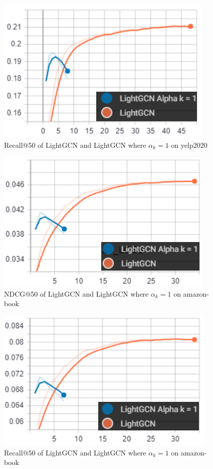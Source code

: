 \begin{figure}
    \includegraphics[width=\linewidth]{figures/alpha-k-results/yelp2020-recall.png}
    \caption{Recall@50 of LightGCN and LightGCN where $\alpha_k = 1$ on yelp2020}
    \label{fig:recall-yelp2020-alpha-k}
\end{figure}
\begin{figure}
    \includegraphics[width=\linewidth]{figures/alpha-k-results/amazon-ndcg.png}
    \caption{NDCG@50 of LightGCN and LightGCN where $\alpha_k = 1$ on amazon-book}
    \label{fig:ndcg-amazon-alpha-k}
\end{figure}
\begin{figure}
    \includegraphics[width=\linewidth]{figures/alpha-k-results/amazon-recall.png}
    \caption{Recall@50 of LightGCN and LightGCN where $\alpha_k = 1$ on amazon-book}
    \label{fig:recall-amazon-alpha-k}
\end{figure}